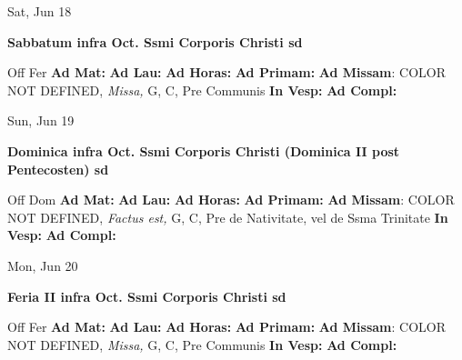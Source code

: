 \documentclass[10pt]{memoir}
\begin{document}
\begin{center}
\begin{minipage}{3.5in}
\vspace{2em}
\begin{center}Sat, Jun 18
\end{center}
\textbf{ \large Sabbatum infra Oct. Ssmi Corporis Christi
\textnormal{\normalsize sd}}

\begin{justify}Off Fer
\textbf{Ad Mat: }
\textbf{Ad Lau: }
\textbf{Ad Horas: }
\textbf{Ad Primam: }\textbf{Ad Missam}: COLOR NOT DEFINED, \textit{Missa,} G, C, Pre Communis
\textbf{In Vesp: }
\textbf{Ad Compl: }
\end{justify}
\end{minipage}
\end{center}

\begin{center}
\begin{minipage}{3.5in}
\vspace{2em}
\begin{center}Sun, Jun 19
\end{center}
\textbf{ \large Dominica infra Oct. Ssmi Corporis Christi (Dominica II post Pentecosten)
\textnormal{\normalsize sd}}

\begin{justify}Off Dom
\textbf{Ad Mat: }
\textbf{Ad Lau: }
\textbf{Ad Horas: }
\textbf{Ad Primam: }\textbf{Ad Missam}: COLOR NOT DEFINED, \textit{Factus est,} G, C, Pre de Nativitate, vel de Ssma Trinitate
\textbf{In Vesp: }
\textbf{Ad Compl: }
\end{justify}
\end{minipage}
\end{center}

\begin{center}
\begin{minipage}{3.5in}
\vspace{2em}
\begin{center}Mon, Jun 20
\end{center}
\textbf{ \large Feria II infra Oct. Ssmi Corporis Christi
\textnormal{\normalsize sd}}

\begin{justify}Off Fer
\textbf{Ad Mat: }
\textbf{Ad Lau: }
\textbf{Ad Horas: }
\textbf{Ad Primam: }\textbf{Ad Missam}: COLOR NOT DEFINED, \textit{Missa,} G, C, Pre Communis
\textbf{In Vesp: }
\textbf{Ad Compl: }
\end{justify}
\end{minipage}
\end{center}
\end{document}
